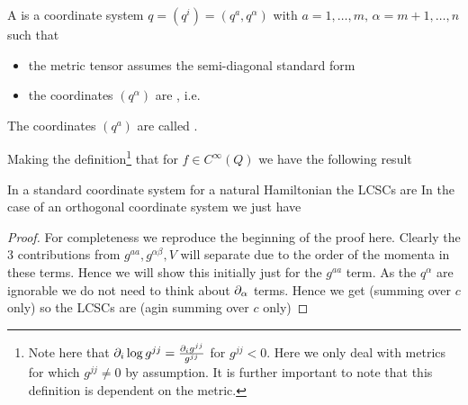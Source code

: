 \documentclass{article}
\begin{document}
\begin{definition}
A  is a coordinate system $q = (q^i) = (q^a, q^\alpha)$ with $a = 1, \dots, m, \, \alpha = m+1, \dots, n$ such that 
\begin{itemize}
    \item the metric tensor assumes the semi-diagonal standard form 
\item the coordinates $(q^\alpha)$ are , i.e. 
\end{itemize}
The coordinates $(q^a)$ are called .
\end{definition}

Making the definition\footnote{Note here that $\partial_i \log g^{jj} = \frac{\partial_i g^{jj}}{g^{jj}}$ for $g^{jj} < 0$. Here we only deal with metrics for which $g^{jj} \neq 0$ by assumption. It is further important to note that this definition is dependent on the metric.} that for $f \in C^\infty(Q)$
we have the following result

\begin{prop}\label{prop:SHJE:LCSCs}
In a standard coordinate system for a natural Hamiltonian the LCSCs are 
In the case of an orthogonal coordinate system we just have 
\end{prop}
\begin{proof}
For completeness we reproduce the beginning of the proof here. Clearly the 3 contributions from $g^{aa}, g^{\alpha\beta},V$ will separate due to the order of the momenta in these terms. Hence we will show this initially just for the $g^{aa}$ term. As the $q^\alpha$ are ignorable we do not need to think about $\partial_\alpha$ terms. Hence we get (summing over $c$ only)
so the LCSCs are (agin summing over $c$ only)
\end{proof}
\end{document}

